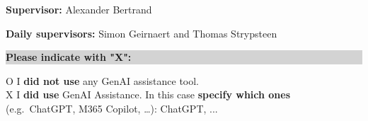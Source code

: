 \vspace{1em}

\textbf{Supervisor:} Alexander Bertrand

\vspace{1em}

\textbf{Daily supervisors:} Simon Geirnaert and Thomas Strypsteen

\vspace{2em}

\noindent
\colorbox{lightgray}{\parbox{\dimexpr\linewidth-2\fboxsep\relax}{\textbf{Please indicate with "X":}}}

\vspace{1em}

O I \textbf{did not use} any GenAI assistance tool. \\[1em]

X I \textbf{did use} GenAI Assistance. In this case \textbf{specify which ones} (e.g.\ ChatGPT, M365 Copilot, …): ChatGPT, ...




\newpage



\newcommand{\Cell}[1]{\begin{minipage}[t]{\linewidth}\raggedright\small #1\end{minipage}}

\setlength{\tabcolsep}{6pt}
\renewcommand{\arraystretch}{1.2}

